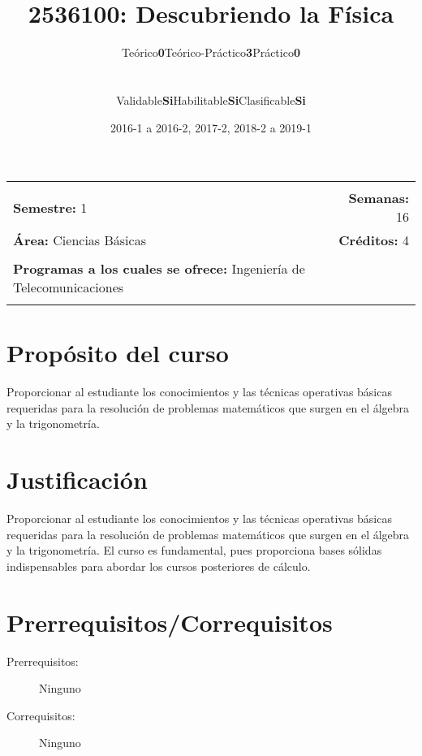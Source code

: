 \documentclass[11pt]{article}
\title{2536100: Descubriendo la Física}
\author{\begin{tabular} {c|c|c|c|c|c} Teórico & \textbf{0} & Teórico-Práctico & \textbf{3} & Práctico & \textbf{0}\end{tabular}
\\
\begin{tabular} {c|c|c|c|c|c} Validable & \textbf{Si} & Habilitable & \textbf{Si} & Clasificable & \textbf{Si}\end{tabular}}
\date{2016-1 a 2016-2, 2017-2, 2018-2 a 2019-1}
\newcommand{\blankline}{\quad\pagebreak[2]}
\begin{document}
\maketitle

\begin{tabular*}{.93\textwidth}{@{\extracolsep{\fill}}lr}
\hline\\

\textbf{Semestre:} 1 & \textbf{Semanas:} 16
\\
\textbf{Área:} Ciencias Básicas &    \textbf{Créditos:} 4 
\\ & \\
\textbf{Programas a los cuales se ofrece:} Ingeniería de Telecomunicaciones
\\ & \\
\hline
\end{tabular*}

\vspace{5 mm}

\section*{Propósito del curso}

Proporcionar al estudiante los conocimientos y las técnicas operativas básicas requeridas para la resolución de problemas matemáticos que surgen en el álgebra y la trigonometría.



\section*{Justificación}

Proporcionar al estudiante los conocimientos y las técnicas operativas básicas requeridas para la resolución de problemas matemáticos que surgen en el álgebra y la trigonometría. El curso es fundamental, pues proporciona bases sólidas indispensables para abordar los cursos posteriores de cálculo.

\section*{Prerrequisitos/Correquisitos}
\begin{description}
\item [Prerrequisitos:] Ninguno
\item[Correquisitos:] Ninguno
\end{description}
\end{document}
